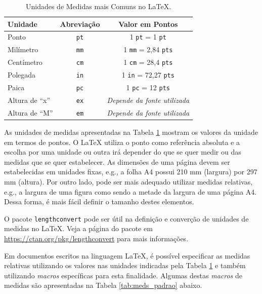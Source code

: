 \begin{table}[H]
\centering
\caption{Unidades de Medidas mais Comuns no \LaTeX{}.}
\label{tab:medidas}
    \begin{tabular}{p{3cm}cc}
    \toprule
    \textbf{Unidade} & \textbf{Abreviação} & \textbf{Valor em Pontos} \\
    \midrule
    Ponto           & {\tt pt} & 1 {\tt pt} = 1 {\tt pt}               \\
    Milímetro       & {\tt mm} & 1 {\tt mm} = 2,84 {\tt pts}           \\
    Centímetro      & {\tt cm} & 1 {\tt cm} = 28,4 {\tt pts}           \\
    Polegada        & {\tt in} & 1 {\tt in} = 72,27 {\tt pts}          \\
    Paica           & {\tt pc} & 1 {\tt pc} = 12 {\tt pts}             \\
    Altura de ``x'' & {\tt ex} & \textit{Depende da fonte utilizada}   \\
    Altura de ``M'' & {\tt em} & \textit{Depende da fonte utilizada}   \\
    \bottomrule
    \end{tabular}
\end{table}

As unidades de medidas apresentadas na Tabela \ref{tab:medidas} mostram os valores da unidade em termos de pontos. O \LaTeX{} utiliza o ponto como referência absoluta e a escolha por uma unidade ou outra irá depender do que se quer medir ou das medidas que se quer estabelecer. As dimensões de uma página devem ser estabelecidas em unidades fixas, e.g., a folha A4 possui 210 mm (largura) por 297 mm (altura). Por outro lado, pode ser mais adequado utilizar medidas relativas, e.g., a largura de uma figura como sendo a metade da largura de uma página A4. Dessa forma, é mais fácil definir o tamanho destes elementos.

\begin{marker}
O pacote {\tt lengthconvert} pode ser útil na definição e converção de unidades de medidas no \LaTeX{}. Veja a página do pacote em \url{https://ctan.org/pkg/lengthconvert} para mais informações.
\end{marker}

Em documentos escritos na linguagem \LaTeX{}, é possível especificar as medidas relativas utilizando os valores nas unidades indicadas pela Tabela \ref{tab:medidas} e também utilizando \textit{macros} específicas para esta finalidade. Algumas destas \textit{macros} de medidas são apresentadas na Tabela \ref{tab:meds_padrao} abaixo.

